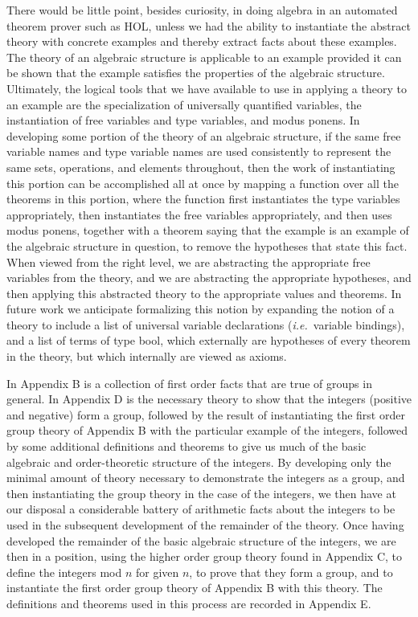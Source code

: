 There would be little point, besides curiosity, in doing algebra in an
automated theorem prover such as HOL, unless we had the ability to
instantiate the abstract theory with concrete examples and thereby
extract facts about these examples.  The theory of an algebraic
structure is applicable to an example provided it can be shown that the
example satisfies the properties of the algebraic structure.
Ultimately, the logical tools that we have available to use in
applying a theory to an example are the specialization of universally
quantified variables, the instantiation of free variables and type
variables, and modus ponens.  In developing some portion of the theory
of an algebraic structure, if the same free variable names and type
variable names are used consistently to represent the same sets,
operations, and elements throughout, then the work of instantiating
this portion can be accomplished all at once by mapping a function
over all the theorems in this portion, where the function first
instantiates the type variables appropriately, then instantiates the
free variables appropriately, and then uses modus ponens, together
with a theorem saying that the example is an example of the algebraic
structure in question, to remove the hypotheses that state this fact.
When viewed from the right level, we are abstracting the appropriate
free variables from the theory, and we are abstracting the appropriate
hypotheses, and then applying this abstracted theory to the
appropriate values and theorems.  In future work we anticipate
formalizing this notion by expanding the notion of a theory to include
a list of universal variable declarations ({\it i.e.}~variable
bindings), and a list of terms of type bool, which externally are
hypotheses of every theorem in the theory, but which internally are
viewed as axioms.

In Appendix B is a collection of first order facts that are true of
groups in general.  In Appendix D is the necessary theory to show that
the integers (positive and negative) form a group, followed by the
result of instantiating the first order group theory of Appendix B
with the particular example of the integers, followed by some
additional definitions and theorems to give us much of the  basic algebraic
and order-theoretic structure of the integers.  By developing only the
minimal amount of theory necessary to demonstrate the integers as a
group, and then instantiating the group theory in the case of the
integers, we then have at our disposal a considerable battery of
arithmetic facts about the integers to be used in the subsequent
development of the remainder of the theory.  Once having developed the
remainder of the basic algebraic structure of the integers, we are
then in a position, using the higher order group theory found in
Appendix C, to define the integers mod $n$ for given $n$, to prove
that they form a group, and to instantiate the first order group
theory of Appendix B with this theory.  The definitions and theorems
used in this process are recorded in Appendix E.


